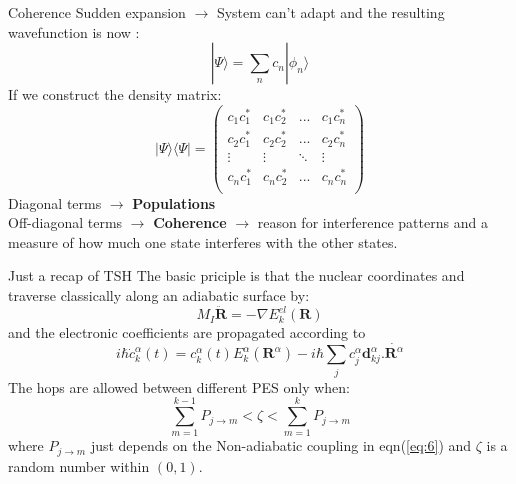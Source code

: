 \documentclass{beamer}
\begin{document}
	\begin{frame}[t]{Coherence}
	Sudden expansion $\rightarrow$ System can't adapt and the resulting wavefunction is now : 
	\begin{equation}\label{eq:3}
	|\Psi\rangle = \sum_nc_n|\phi_n\rangle
	\end{equation}
	If we construct the density matrix:
	\begin{equation}\label{eq:4}
	|\Psi\rangle\langle\Psi| = \begin{pmatrix}
c_1c_1^* & c_1c_2^* & ... & c_1c_n^*\\
c_2c_1^* & c_2c_2^* & ... & c_2c_n^*\\
\vdots & \vdots & \ddots & \vdots \\
c_nc_1^* & c_nc_2^* & ... & c_nc_n^*\\
\end{pmatrix}
	\end{equation}
	Diagonal terms $\rightarrow$ \textbf{Populations}\\
	Off-diagonal terms $\rightarrow$ \textbf{Coherence} $\rightarrow$ reason for interference patterns and a measure of how much one state interferes with the other states.
	\end{frame}		
	
	\begin{frame}[t]{Just a recap of TSH}
	The basic priciple is that the nuclear coordinates and traverse classically along an adiabatic surface by:
	\begin{equation}\label{eq:5}
	M_I\ddot{\textbf{R}} = -\nabla E_k^{el}(\textbf{R})
    \end{equation}
    and the electronic coefficients are propagated according to 
    \begin{equation}\label{eq:6}
    i\hbar\dot{c}_k^\alpha(t) = c_k^\alpha(t)E_k^\alpha(\textbf{R}^\alpha) - i\hbar \sum_jc_j^\alpha \textbf{d}_{kj}^\alpha \textbf{.}\dot{\textbf{R}^\alpha}
    \end{equation}
    The hops are allowed between different PES only when:
    \begin{equation}\label{eq:7}
    \sum_{m=1}^{k-1}P_{j\rightarrow m} < \zeta <  \sum_{m=1}^{k}P_{j\rightarrow m}
    \end{equation}    
    where $P_{j\rightarrow m}$ just depends on the Non-adiabatic coupling in eqn(\ref{eq:6}) and $\zeta$ is a random number within $(0,1)$.	 
	\end{frame}
	
\end{document}
